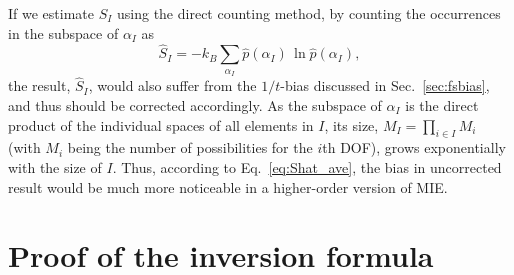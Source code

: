 \documentclass[reprint, superscriptaddress]{revtex4-1}
\newcommand{\note}[1]{{\color{DarkGreen}\footnotesize \textsc{Note.} #1}}
\newcommand{\MI}{\mathcal I} %
\begin{document}
%


If we estimate $S_I$ using the direct counting method,
by counting the occurrences in the subspace of $\alpha_I$ as
$$
\hat S_I = - k_B \sum_{\alpha_I} \hat p(\alpha_I) \, \ln \hat p(\alpha_I),
$$
the result, $\hat S_I$, would also suffer from the $1/t$-bias discussed
in Sec.~\ref{sec:fsbias}, and thus should be corrected accordingly.
%
As the subspace of $\alpha_I$ is the direct product of
the individual spaces of all elements in $I$,
its size, $M_I = \prod_{i \in I} M_i$
(with $M_i$ being the number of possibilities for the $i$th DOF),
grows exponentially with the size of $I$.
%
Thus, according to Eq.~\eqref{eq:Shat_ave},
the bias in uncorrected result would be much more noticeable
in a higher-order version of MIE.


\appendix

\section{\label{sec:inclexcl}
Proof of the inversion formula }
\end{document}
